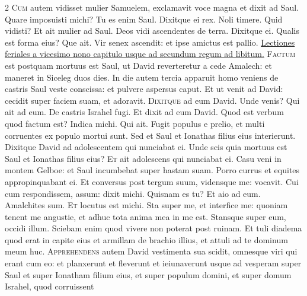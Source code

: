 \begin{multicols*}{2}
\lettrine[lines=2]{\zallmancaps \color{Red} C}{um} autem vidisset mulier Samuelem, exclamavit voce magna et dixit ad Saul. Quare imposuisti michi? Tu es enim Saul. Dixitque ei rex. Noli timere. Quid vidisti? Et ait mulier ad Saul. Deos vidi ascendentes de terra. Dixitque ei. Qualis est forma eius? Que ait. Vir senex ascendit: et ipse amictus est pallio.
\newline \ul{Lectiones feriales a vicesimo nono capitulo usque ad secundum regum ad libitum.}
{\color{Red} }
\lettrine[lines=2]{\zallmancaps \color{Blue} F}{actum} est postquam mortuus est Saul, ut David reverteretur a cede Amalech: et maneret in Siceleg duos dies. In die autem tercia apparuit homo veniens de castris Saul veste conscissa: et pulvere aspersus caput. Et ut venit ad David: cecidit super faciem suam, et adoravit.%
\lettrine[lines=2]{\zallmancaps \color{Red} D}{ixitque} ad eum David. Unde venis? Qui ait ad eum. De castris Israhel fugi. Et dixit ad eum David. Quod est verbum quod factum est? Indica michi. Qui ait. Fugit populus e prelio, et multi corruentes ex populo mortui sunt. Sed et Saul et Ionathas filius eius interierunt. Dixitque David ad adolescentem qui nunciabat ei. Unde scis quia mortuus est Saul et Ionathas filius eius?
\lettrine[lines=2]{\zallmancaps \color{Blue} E}{t} ait adolescens qui nunciabat ei. Casu veni in montem Gelboe: et Saul incumbebat super hastam suam. Porro currus et equites appropinquabant ei. Et conversus post tergum suum, vidensque me: vocavit. Cui cum respondissem, assum: dixit michi. Quisnam es tu? Et aio ad eum. Amalchites sum.
\lettrine[lines=2]{\zallmancaps \color{Red} E}{t} locutus est michi. Sta super me, et interfice me: quoniam tenent me angustie, et adhuc tota anima mea in me est. Stansque super eum, occidi illum. Sciebam enim quod vivere non poterat post ruinam. Et tuli diadema quod erat in capite eius et armillam de brachio illius, et attuli ad te dominum meum huc.
\lettrine[lines=2]{\zallmancaps \color{Blue} A}{pprehendens} autem David vestimenta sua scidit, omnesque viri qui erant cum eo: et planxerunt et fleverunt et ieiunaverunt usque ad vesperam super Saul et super Ionatham filium eius, et super populum domini, et super domum Israhel, quod corruissent

\end{multicols*}
